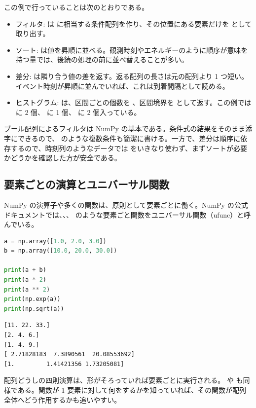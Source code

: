 この例で行っていることは次のとおりである。

\begin{itemize}
\item フィルタ:  は  に相当する条件配列を作り、その位置にある要素だけを  として取り出す。
\item ソート:  は値を昇順に並べる。観測時刻やエネルギーのように順序が意味を持つ量では、後続の処理の前に並べ替えることが多い。
\item 差分:  は隣り合う値の差を返す。返る配列の長さは元の配列より 1 つ短い。イベント時刻が昇順に並んでいれば、これは到着間隔として読める。
\item ヒストグラム:  は、区間ごとの個数を 、区間境界を  として返す。この例では \code{[0, 20)} に 2 個、\code{[20, 40)} に 1 個、\code{[40, 60]} に 2 個入っている。
\end{itemize}

ブール配列によるフィルタは NumPy の基本である。条件式の結果をそのまま添字にできるので、 のような複数条件も簡潔に書ける。一方で、差分は順序に依存するので、時刻列のようなデータでは  をいきなり使わず、まずソートが必要かどうかを確認した方が安全である。

\subsection{要素ごとの演算とユニバーサル関数}

NumPy の演算子や多くの関数は、原則として要素ごとに働く。NumPy の公式ドキュメントでは、、、 のような要素ごと関数をユニバーサル関数（ufunc）と呼んでいる。

\begin{lstlisting}[language=Python]
a = np.array([1.0, 2.0, 3.0])
b = np.array([10.0, 20.0, 30.0])

print(a + b)
print(a * 2)
print(a ** 2)
print(np.exp(a))
print(np.sqrt(a))
\end{lstlisting}

\begin{lstlisting}[numbers=none, xleftmargin=2\zw]
[11. 22. 33.]
[2. 4. 6.]
[1. 4. 9.]
[ 2.71828183  7.3890561  20.08553692]
[1.         1.41421356 1.73205081]
\end{lstlisting}

配列どうしの四則演算は、形がそろっていれば要素ごとに実行される。 や  も同様である。関数が 1 要素に対して何をするかを知っていれば、その関数が配列全体へどう作用するかも追いやすい。

